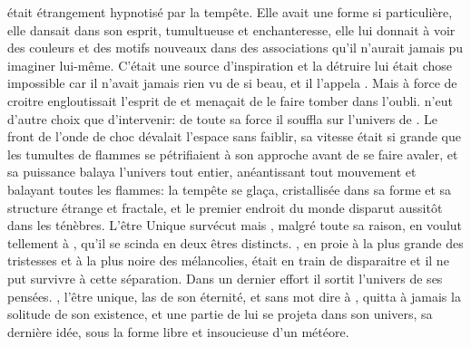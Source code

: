   \Mey était étrangement hypnotisé par la tempête. Elle avait une forme si particulière, elle dansait dans son esprit, tumultueuse et enchanteresse, elle lui donnait à voir des couleurs et des motifs nouveaux dans des associations qu'il n'aurait jamais pu imaginer lui-même. C'était une source d'inspiration et la détruire lui était chose impossible car il n'avait jamais rien vu de si beau, et il l'appela \Auga. Mais \Auga à force de croitre engloutissait l'esprit de \Mey et menaçait de le faire tomber dans l'oubli. \Cind n'eut d'autre choix que d'intervenir: de toute sa force il souffla sur l'univers de \Mey. Le front de l'onde de choc dévalait l'espace sans faiblir, sa vitesse était si grande que les tumultes de flammes se pétrifiaient à son approche avant de se faire avaler, et sa puissance balaya l'univers tout entier, anéantissant tout mouvement et balayant toutes les flammes: la tempête se glaça, cristallisée dans sa forme et sa structure étrange et fractale, et le premier endroit du monde disparut aussitôt dans les ténèbres. L'être Unique survécut mais \Mey, malgré toute sa raison, en voulut tellement à \Cind, qu'il se scinda en deux êtres distincts. \Mey, en proie à la plus grande des tristesses et à la plus noire des mélancolies, était en train de disparaitre et il ne put survivre à cette séparation. Dans un dernier effort il sortit l'univers de ses pensées. \Mey, l'être unique, las de son éternité, et sans mot dire à \Cind, quitta à jamais la solitude de son existence, et une partie de lui se projeta dans son univers, sa dernière idée, sous la forme libre et insoucieuse d'un météore.
  
  
  